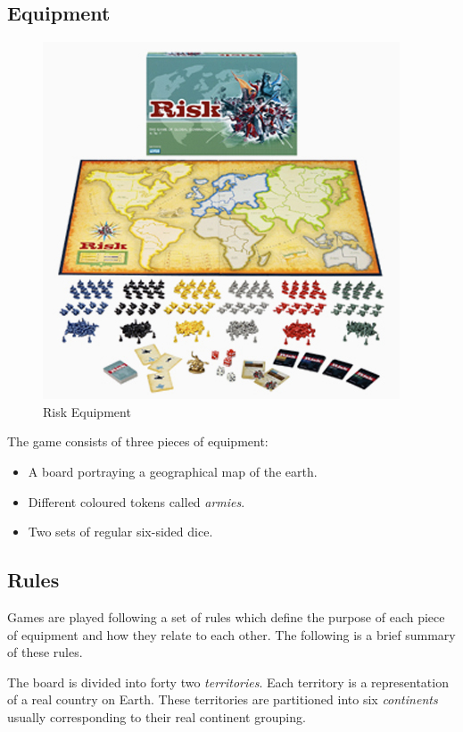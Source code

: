 \documentclass[parskip]{cs4rep}
\begin{document}
\subsection{Equipment}

\begin{figure}[h]
\centering
\includegraphics{images/risk-board}
\caption{Risk Equipment}
\label{fig:risk-equipment}
\end{figure}

The game consists of three pieces of equipment:

\begin{itemize}
\item
A board portraying a geographical map of the earth.
\item
Different coloured tokens called \textit{armies}.
\item
Two sets of regular six-sided dice.
\end{itemize}

\subsection{Rules}

Games are played following a set of rules which define the purpose of each piece of equipment and how they relate to each other. The following is a brief summary of these rules.

The board is divided into forty two \textit{territories}. Each territory is a representation of a real country on Earth. These territories are partitioned into six \textit{continents} usually corresponding to their real continent grouping.
\end{document}
